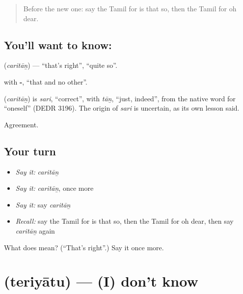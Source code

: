 \label{lesson:TA-C96-thatsright}



\begin{quote}
Before the new one: say the Tamil for is that so, then the Tamil for oh dear.
\end{quote}

\subsection*{You'll want to know: }
\textbf{} (\emph{caritāṉ}) — \textquotedblleft{}that's right\textquotedblright{}, \textquotedblleft{}quite so\textquotedblright{}.

\textbf{} with \textbf{-}, \textquotedblleft{}that and no other\textquotedblright{}.

\begin{cousinweb}
\textbf{} (\emph{caritāṉ}) is \emph{sari}, \textquotedblleft{}correct\textquotedblright{}, with \emph{tāṉ}, \textquotedblleft{}just, indeed\textquotedblright{}, from the native word for \textquotedblleft{}oneself\textquotedblright{} (DEDR 3196). The origin of \emph{sari} is uncertain, as its own lesson said.
\end{cousinweb}

\begin{grammarlens}[title={What you've built}]
Agreement.
\end{grammarlens}

\subsection*{Your turn}
\begin{itemize}
\raggedright
  \item \emph{Say it:} \emph{caritāṉ}
  \item \emph{Say it:} \emph{caritāṉ}, once more
  \item \emph{Say it:} say \emph{caritāṉ}
  \item \emph{Recall:} say the Tamil for is that so, then the Tamil for oh dear, then say \emph{caritāṉ} again
\end{itemize}

\begin{tcolorbox}[breakable,colback=teal!4,colframe=teal!35!black,title={Before you move on}]
What does  mean? (\textquotedblleft{}That's right\textquotedblright{}.) Say it once more.
\end{tcolorbox}
\section[\texorpdfstring{\ta{தெரியாது} (teriyātu)}{தெரியாது (teriyātu)}]{ (teriyātu) — (I) don't know}

